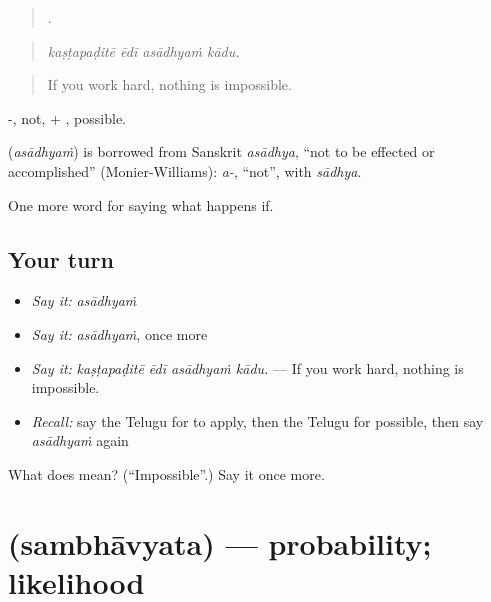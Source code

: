 \begin{quote}
   .
\end{quote}

\begin{quote}
\emph{kaṣṭapaḍitē ēdī asādhyaṁ kādu.}
\end{quote}

\begin{quote}
If you work hard, nothing is impossible.
\end{quote}

-, not, + , possible.

\begin{cousinweb}
\textbf{} (\emph{asādhyaṁ}) is borrowed from Sanskrit \emph{asādhya}, \textquotedblleft{}not to be effected or accomplished\textquotedblright{} (Monier-Williams): \emph{a-}, \textquotedblleft{}not\textquotedblright{}, with \emph{sādhya}.
\end{cousinweb}

\begin{grammarlens}[title={What you've built}]
One more word for saying what happens if.
\end{grammarlens}

\subsection*{Your turn}
\begin{itemize}
\raggedright
  \item \emph{Say it:} \emph{asādhyaṁ}
  \item \emph{Say it:} \emph{asādhyaṁ}, once more
  \item \emph{Say it:} \emph{kaṣṭapaḍitē ēdī asādhyaṁ kādu.} — If you work hard, nothing is impossible.
  \item \emph{Recall:} say the Telugu for to apply, then the Telugu for possible, then say \emph{asādhyaṁ} again
\end{itemize}

\begin{tcolorbox}[breakable,colback=teal!4,colframe=teal!35!black,title={Before you move on}]
What does  mean? (\textquotedblleft{}Impossible\textquotedblright{}.) Say it once more.
\end{tcolorbox}
\section[\texorpdfstring{\te{సంభావ్యత} (sambhāvyata)}{సంభావ్యత (sambhāvyata)}]{ (sambhāvyata) — probability; likelihood}

